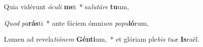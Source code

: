 \item Quia vidérunt \textit{ó}\textit{cu}\textit{li} \textbf{me}i~* sa\textit{lu}\textit{tá}\textit{re} \textbf{tu}um,
\item \textit{Quod} \textit{pa}\textbf{rás}ti~* ante fáciem ómni\textit{um} \textit{po}\textit{pu}\textbf{ló}rum,
\item Lumen ad revela\textit{ti}\textit{ó}\textit{nem} \textbf{Gén}\textbf{ti}um,~* et glóriam ple\textit{bis} \textit{tu}\textit{æ} \textbf{Is}raël.
